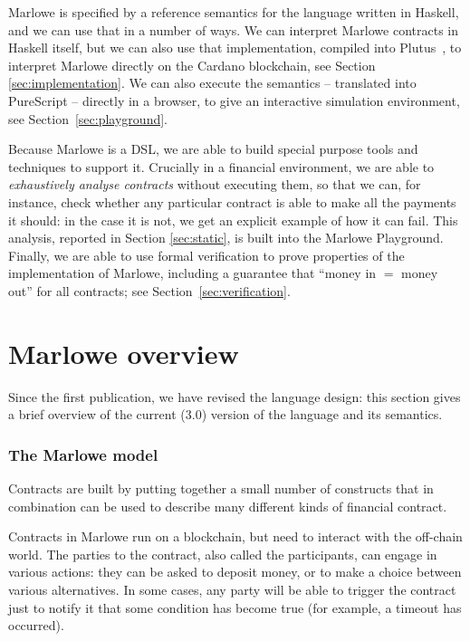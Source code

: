 \documentclass[runningheads]{llncs}
\begin{document}
Marlowe is specified by a reference semantics for the language written in Haskell, and we can use that in a number of ways. We can interpret Marlowe contracts in Haskell itself, but we can also use that implementation, compiled into Plutus~\cite{PlutusPlatform}, to interpret Marlowe directly on the Cardano blockchain, see Section \ref{sec:implementation}. We can also execute the semantics -- translated into PureScript -- directly in a browser, to give an interactive simulation environment, see Section~\ref{sec:playground}.

Because Marlowe is a DSL, we are able to build special purpose tools and techniques to support it. Crucially in a financial environment, we are able to \emph{exhaustively analyse contracts} without executing them, so that we can, for instance, check whether any particular contract is able to make all the payments it should: in the case it is not, we get an explicit example of how it can fail. This analysis, reported in Section \ref{sec:static}, is built into the Marlowe Playground. Finally, we are able to use formal verification to prove properties of the implementation of Marlowe, including a guarantee that ``money in $=$ money out'' for all contracts; see Section~\ref{sec:verification}.

\section{Marlowe overview}
\label{sec:overview}

Since the first publication, we have revised the language design: this section gives a brief overview of the current (3.0) version of the language and its semantics.


\subsubsection*{The Marlowe model}

Contracts are built by putting together a small number of constructs that in combination can be used to describe many different kinds of financial contract.

Contracts in Marlowe run on a blockchain, but need to interact with the off-chain world. The parties to the contract, also called the participants, can engage in various actions: they can be asked to deposit money, or to make a choice between various alternatives. In some cases, any party will be able to trigger the contract just to notify it that some condition has become true (for example, a timeout has occurred).
\end{document}
